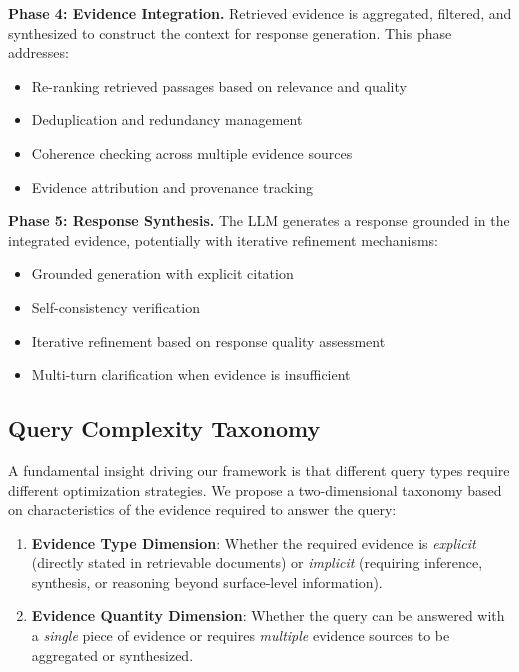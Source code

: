 \documentclass{article}
\begin{document}
\textbf{Phase 4: Evidence Integration.} Retrieved evidence is aggregated, filtered, and synthesized to construct the context for response generation. This phase addresses:
\begin{itemize}[leftmargin=*,nosep]
    \item Re-ranking retrieved passages based on relevance and quality
    \item Deduplication and redundancy management
    \item Coherence checking across multiple evidence sources
    \item Evidence attribution and provenance tracking
\end{itemize}

\textbf{Phase 5: Response Synthesis.} The LLM generates a response grounded in the integrated evidence, potentially with iterative refinement mechanisms:
\begin{itemize}[leftmargin=*,nosep]
    \item Grounded generation with explicit citation
    \item Self-consistency verification
    \item Iterative refinement based on response quality assessment
    \item Multi-turn clarification when evidence is insufficient
\end{itemize}

\subsection{Query Complexity Taxonomy}

A fundamental insight driving our framework is that different query types require different optimization strategies. We propose a two-dimensional taxonomy based on characteristics of the evidence required to answer the query:

\begin{enumerate}[leftmargin=*]
    \item \textbf{Evidence Type Dimension}: Whether the required evidence is \textit{explicit} (directly stated in retrievable documents) or \textit{implicit} (requiring inference, synthesis, or reasoning beyond surface-level information).
    
    \item \textbf{Evidence Quantity Dimension}: Whether the query can be answered with a \textit{single} piece of evidence or requires \textit{multiple} evidence sources to be aggregated or synthesized.
\end{enumerate}
\end{document}
